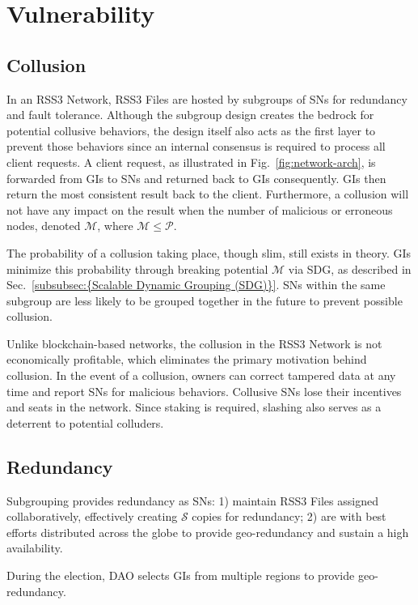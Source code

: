 \section{Vulnerability}

\subsection{Collusion}
In an RSS3 Network, RSS3 Files are hosted by subgroups of SNs for redundancy and fault tolerance. Although the subgroup design creates the bedrock for potential collusive behaviors, the design itself also acts as the first layer to prevent those behaviors since an internal consensus is required to process all client requests. A client request, as illustrated in Fig.~\ref{fig:network-arch}, is forwarded from GIs to SNs and returned back to GIs consequently. GIs then return the most consistent result back to the client. Furthermore, a collusion will not have any impact on the result when the number of malicious or erroneous nodes, denoted $\mathcal{M}$, where $\mathcal{M} \le \mathcal{P}$.

The probability of a collusion taking place, though slim, still exists in theory. GIs minimize this probability through breaking potential $\mathcal{M}$ via SDG, as described in Sec.~\ref{subsubsec:{Scalable Dynamic Grouping (SDG)}}. SNs within the same subgroup are less likely to be grouped together in the future to prevent possible collusion.

Unlike blockchain-based networks, the collusion in the RSS3 Network is not economically profitable, which eliminates the primary motivation behind collusion\cite{schrepel2019Collusion}. In the event of a collusion, owners can correct tampered data at any time and report SNs for malicious behaviors. Collusive SNs lose their incentives and seats in the network. Since staking is required, slashing also serves as a deterrent to potential colluders.

\subsection{Redundancy}
Subgrouping provides redundancy as SNs: 1) maintain RSS3 Files assigned collaboratively, effectively creating $\mathcal{S}$ copies for redundancy; 2) are with best efforts distributed across the globe to provide geo-redundancy and sustain a high availability.

During the election, DAO selects GIs from multiple regions to provide geo-redundancy.


